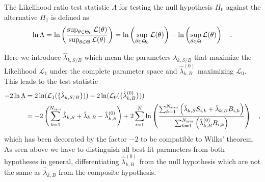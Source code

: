 The Likelihood ratio test statistic $\Lambda$ for testing the null hypothesis $H_0$ against the alternative $H_1$ is defined as
\begin{equation}
  \ln\Lambda = \ln\left(\frac{\sup_{\theta \in \Theta_0} \mathcal{L}(\theta)}
                          {\sup_{\theta \in \Theta} \mathcal{L}(\theta)}\right)
  = \ln\left(\sup_{\theta \in \Theta_0} \mathcal{L}(\theta)\right) -
    \ln\left(\sup_{\theta \in \Theta} \mathcal{L}(\theta)\right)
  \quad\text{.}
\end{equation}

Here we introduce $\hat{\lambda}_{k,S/B}$ which mean the parameters $\lambda_{k,S/B}$ that maximize the Likelihood $\mathcal{L}_1$ under the complete parameter space and $\hat{\lambda}_{k,B}^{(0)}$ maximizing $\mathcal{L}_0$.
This leads to the test statistic
\begin{equation}
  \begin{aligned}
    -2\ln\Lambda
    &= 2\ln(\mathcal{L}_1(\{\hat{\lambda}_{k,S/B}\})) -
       2\ln(\mathcal{L}_0(\{\hat{\lambda}^{(0)}_{k,B}\})) \\
    &= -2\left(\sum_{k=1}^{N_\text{srcs}}\hat{\lambda}_{k,S} +
                                         \hat{\lambda}_{k,B} -
                                         \hat{\lambda}_{k,S}^{(0)}\right) +
      2\sum_{i=1}^N \ln\left(
        \frac{\sum_{k=1}^{N_\text{srcs}}\left(
            \hat{\lambda}_{k,S} S_{i,k}+\hat{\lambda}_{k,B} B_{i,k}\right)}
            {\sum_{k=1}^{N_\text{srcs}}\left(
              \hat{\lambda}_{k,B}^{(0)} B_{i,k}
            \right)}
          \right)
    \quad\text{,}
  \end{aligned}
\end{equation}
which has been decorated by the factor $-2$ to be compatible to Wilks' theorem.
As seen above we have to distinguish all best fit parameters from both hypotheses in general, differentiating $\hat{\lambda}_{k,B}^{(0)}$ from the null hypothesis which are not the same as $\hat{\lambda}_{k,B}$ from the composite hypothesis.

